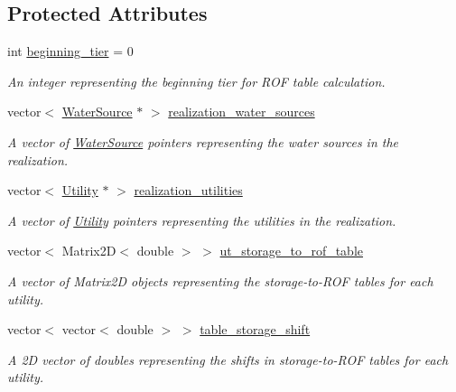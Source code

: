 \subsection*{Protected Attributes}
\begin{DoxyCompactItemize}
\item 
int \mbox{\hyperlink{classContinuityModelROF_ad0a8c47eca4ca66b58a2636ab907a4f2}{beginning\+\_\+tier}} = 0
\begin{DoxyCompactList}\small\item\em An integer representing the beginning tier for R\+OF table calculation. \end{DoxyCompactList}\item 
vector$<$ \mbox{\hyperlink{classWaterSource}{Water\+Source}} $\ast$ $>$ \mbox{\hyperlink{classContinuityModelROF_a77048d247b8d1f70fbdd31559b4d3337}{realization\+\_\+water\+\_\+sources}}
\begin{DoxyCompactList}\small\item\em A vector of {\ttfamily \mbox{\hyperlink{classWaterSource}{Water\+Source}}} pointers representing the water sources in the realization. \end{DoxyCompactList}\item 
vector$<$ \mbox{\hyperlink{classUtility}{Utility}} $\ast$ $>$ \mbox{\hyperlink{classContinuityModelROF_a75c6823d8dd37f274ee91ce158088dc4}{realization\+\_\+utilities}}
\begin{DoxyCompactList}\small\item\em A vector of {\ttfamily \mbox{\hyperlink{classUtility}{Utility}}} pointers representing the utilities in the realization. \end{DoxyCompactList}\item 
vector$<$ Matrix2D$<$ double $>$ $>$ \mbox{\hyperlink{classContinuityModelROF_ada25d241caf860255ad00097f5e7adb6}{ut\+\_\+storage\+\_\+to\+\_\+rof\+\_\+table}}
\begin{DoxyCompactList}\small\item\em A vector of {\ttfamily Matrix2D} objects representing the storage-\/to-\/\+R\+OF tables for each utility. \end{DoxyCompactList}\item 
vector$<$ vector$<$ double $>$ $>$ \mbox{\hyperlink{classContinuityModelROF_a1a90c8816944aab36f395e89f7b84c06}{table\+\_\+storage\+\_\+shift}}
\begin{DoxyCompactList}\small\item\em A 2D vector of doubles representing the shifts in storage-\/to-\/\+R\+OF tables for each utility. \end{DoxyCompactList}\item 

\end{DoxyCompactItemize}
